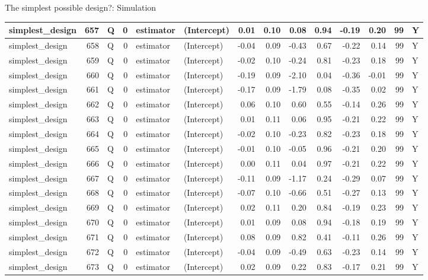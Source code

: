 \documentclass[
  11pt,
  ignorenonframetext,
]{beamer}
\begin{document}
\begin{frame}[fragile]{The simplest possible design?: Simulation}
\begin{tabular}{l|r|l|r|l|l|r|r|r|r|r|r|r|l}
\hline
simplest\_design & 657 & Q & 0 & estimator & (Intercept) & 0.01 & 0.10 & 0.08 & 0.94 & -0.19 & 0.20 & 99 & Y\\
\hline
simplest\_design & 658 & Q & 0 & estimator & (Intercept) & -0.04 & 0.09 & -0.43 & 0.67 & -0.22 & 0.14 & 99 & Y\\
\hline
simplest\_design & 659 & Q & 0 & estimator & (Intercept) & -0.02 & 0.10 & -0.24 & 0.81 & -0.23 & 0.18 & 99 & Y\\
\hline
simplest\_design & 660 & Q & 0 & estimator & (Intercept) & -0.19 & 0.09 & -2.10 & 0.04 & -0.36 & -0.01 & 99 & Y\\
\hline
simplest\_design & 661 & Q & 0 & estimator & (Intercept) & -0.17 & 0.09 & -1.79 & 0.08 & -0.35 & 0.02 & 99 & Y\\
\hline
simplest\_design & 662 & Q & 0 & estimator & (Intercept) & 0.06 & 0.10 & 0.60 & 0.55 & -0.14 & 0.26 & 99 & Y\\
\hline
simplest\_design & 663 & Q & 0 & estimator & (Intercept) & 0.01 & 0.11 & 0.06 & 0.95 & -0.21 & 0.22 & 99 & Y\\
\hline
simplest\_design & 664 & Q & 0 & estimator & (Intercept) & -0.02 & 0.10 & -0.23 & 0.82 & -0.23 & 0.18 & 99 & Y\\
\hline
simplest\_design & 665 & Q & 0 & estimator & (Intercept) & -0.01 & 0.10 & -0.05 & 0.96 & -0.21 & 0.20 & 99 & Y\\
\hline
simplest\_design & 666 & Q & 0 & estimator & (Intercept) & 0.00 & 0.11 & 0.04 & 0.97 & -0.21 & 0.22 & 99 & Y\\
\hline
simplest\_design & 667 & Q & 0 & estimator & (Intercept) & -0.11 & 0.09 & -1.17 & 0.24 & -0.29 & 0.07 & 99 & Y\\
\hline
simplest\_design & 668 & Q & 0 & estimator & (Intercept) & -0.07 & 0.10 & -0.66 & 0.51 & -0.27 & 0.13 & 99 & Y\\
\hline
simplest\_design & 669 & Q & 0 & estimator & (Intercept) & 0.02 & 0.11 & 0.20 & 0.84 & -0.19 & 0.23 & 99 & Y\\
\hline
simplest\_design & 670 & Q & 0 & estimator & (Intercept) & 0.01 & 0.09 & 0.08 & 0.94 & -0.18 & 0.19 & 99 & Y\\
\hline
simplest\_design & 671 & Q & 0 & estimator & (Intercept) & 0.08 & 0.09 & 0.82 & 0.41 & -0.11 & 0.26 & 99 & Y\\
\hline
simplest\_design & 672 & Q & 0 & estimator & (Intercept) & -0.04 & 0.09 & -0.49 & 0.63 & -0.23 & 0.14 & 99 & Y\\
\hline
simplest\_design & 673 & Q & 0 & estimator & (Intercept) & 0.02 & 0.09 & 0.22 & 0.83 & -0.17 & 0.21 & 99 & Y\\

\end{tabular}
\end{frame}
\end{document}
